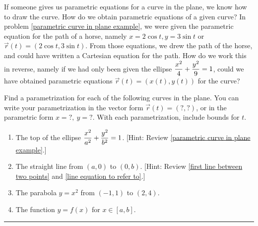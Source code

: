 If someone gives us parametric equations for a curve in the plane, we know how to draw the curve.  How do we obtain parametric equations of a given curve? In problem \ref{parametric curve in plane example}, we were given the parametric equation for the path of a horse, namely $x=2\cos t, y=3 \sin t$ or $\vec r(t)=(2\cos t,3\sin t)$. From those equations, we drew the path of the horse, and could have written a Cartesian equation for the path. How do we work this in reverse, namely if we had only been given the ellipse $\displaystyle\frac{x^2}{4}+\frac{y^2}{9}=1$, could we have obtained parametric equations $\vec r(t)=(x(t),y(t))$ for the curve?
\begin{problem}
%
 Find a parametrization for each of the following curves in the plane. 
 You can write your parametrization in the vector form $\vec r(t)=(?,?)$, or in the parametric form $x=?,\ y=?$. 
 With each parametrization, include bounds for $t$.
\begin{enumerate}
 \item The top of the ellipse $\displaystyle\frac{x^2}{a^2}+\frac{y^2}{b^2}=1$. [Hint: Review \ref{parametric curve in plane example}.]
 \item The straight line from $(a,0)$ to $(0,b)$. [Hint: Review \ref{first line between two points} and \ref{line equation to refer to}.]
 \item The parabola $y=x^2$ from $(-1,1)$ to $(2,4)$.
 \item The function $y=f(x)$ for $x\in[a,b]$.
\end{enumerate}
\hrule\end{problem}

